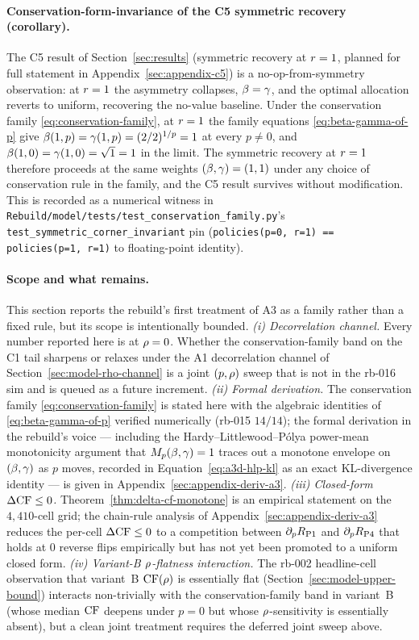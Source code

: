 \paragraph{Conservation-form-invariance of the C5 symmetric recovery
(corollary).}
The C5 result of Section~\ref{sec:results} (symmetric recovery at
$r = 1$, planned for full statement in
Appendix~\ref{sec:appendix-c5}) is a no-op-from-symmetry observation:
at $r = 1$ the asymmetry collapses, $\beta = \gamma$, and the
optimal allocation reverts to uniform, recovering the no-value
baseline. Under the conservation family \eqref{eq:conservation-family},
at $r = 1$ the family equations \eqref{eq:beta-gamma-of-p} give
$\beta(1, p) = \gamma(1, p) = (2/2)^{1/p} = 1$ at every $p \ne 0$,
and $\beta(1, 0) = \gamma(1, 0) = \sqrt{1} = 1$ in the limit. The
symmetric recovery at $r = 1$ therefore proceeds at the same
weights $(\beta, \gamma) = (1, 1)$ under any choice of conservation
rule in the family, and the C5 result survives without modification.
This is recorded as a numerical witness in
\texttt{Rebuild/model/tests/test\_conservation\_family.py}'s
\texttt{test\_symmetric\_corner\_invariant} pin
(\texttt{policies(p=0, r=1) == policies(p=1, r=1)} to floating-point
identity).

\paragraph{Scope and what remains.}
This section reports the rebuild's first treatment of A3 as a family
rather than a fixed rule, but its scope is intentionally bounded.
\emph{(i) Decorrelation channel.} Every number reported here is at
$\rho = 0$. Whether the conservation-family band on the C1 tail
sharpens or relaxes under the A1 decorrelation channel of
Section~\ref{sec:model-rho-channel} is a joint $(p, \rho)$ sweep that
is not in the rb-016 sim and is queued as a future increment.
\emph{(ii) Formal derivation.} The conservation family
\eqref{eq:conservation-family} is stated here with the algebraic
identities of \eqref{eq:beta-gamma-of-p} verified numerically (rb-015
$14/14$); the formal derivation in the rebuild's voice — including the
Hardy--Littlewood--Pólya power-mean monotonicity argument that
$M_p(\beta, \gamma) = 1$ traces out a monotone envelope on
$(\beta, \gamma)$ as $p$ moves, recorded in
Equation~\eqref{eq:a3d-hlp-kl} as an exact KL-divergence identity
— is given in Appendix~\ref{sec:appendix-deriv-a3}. \emph{(iii)
Closed-form $\Delta\mathrm{CF} \le 0$.}
Theorem~\ref{thm:delta-cf-monotone} is an
empirical statement on the $4{,}410$-cell grid; the chain-rule
analysis of Appendix~\ref{sec:appendix-deriv-a3} reduces the per-cell
$\Delta\mathrm{CF} \le 0$ to a competition between $\partial_p R_{\mathrm{P1}}$ and
$\partial_p R_{\mathrm{P4}}$ that holds at $0$ reverse flips empirically but
has not yet been promoted to a uniform closed form. \emph{(iv) Variant-B
$\rho$-flatness interaction.} The rb-002 headline-cell observation
that variant~B $\mathrm{CF}(\rho)$ is essentially flat (Section~\ref{sec:model-upper-bound})
interacts non-trivially with the conservation-family band in
variant~B (whose median $\mathrm{CF}$ deepens under $p = 0$ but whose
$\rho$-sensitivity is essentially absent), but a clean joint
treatment requires the deferred joint sweep above.

